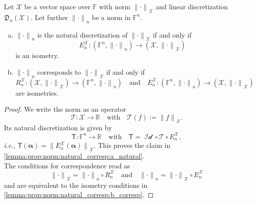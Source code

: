 \documentclass[a4paper]{paper}
\newcommand{\Discr}{\mathfrak{D}}
\newcommand{\Spc}[1]{\mathscr{#1}}
\newcommand{\Field}{\mathbb{F}}
\newcommand{\Real}{\mathbb{R}}
\newcommand{\Op}[1]{\mathcal{#1}}
\newcommand{\DiscOp}[1]{\mathsf{#1}}
\newcommand*{\EXT}[2]{\ensuremath{E_{#1}^{#2}}}
\newcommand*{\REST}[2]{\ensuremath{R_{#1}^{#2}}}
\newcommand*{\RnX}{\ensuremath{\REST{n}{\Spc{X}}}}
\newcommand*{\EnX}{\ensuremath{\EXT{n}{\Spc{X}}}}
\DeclareMathOperator{\Id}{Id}
\newcommand*{\NORM}[1]{\ensuremath{\lVert #1 \rVert}}
\newcommand{\ie}{\textsl{i.e.}\xspace}
\newcommand{\valpha}{\boldsymbol{\alpha}}
\begin{document}
\begin{lemma}
 \label{lemma:prop:norm:natural_corresp}
 Let $\Spc{X}$ be a vector space over $\Field$ with norm $\NORM{\cdot}_{\Spc{X}}$ and linear discretization 
 $\Discr_n(\Spc{X})$. Let further $\NORM{\cdot}_n$ be a norm in $\Field^n$.
 \begin{enumerate}[(a)]
  \item \label{lemma:prop:norm:natural_corresp:a_natural}
  $\NORM{\cdot}_n$ is the natural discretization of $\NORM{\cdot}_{\Spc{X}}$ if and only if
  \begin{equation*}
   \EnX \colon (\Field^n, \NORM{\cdot}_n) \to (\Spc{X}, \NORM{\cdot}_{\Spc{X}})
  \end{equation*}
  is an isometry.
  
  \item \label{lemma:prop:norm:natural_corresp:b_corresp}
  $\NORM{\cdot}_n$ corresponds to $\NORM{\cdot}_{\Spc{X}}$ if and only if
  \begin{equation*}
   \RnX \colon (\Spc{X}, \NORM{\cdot}_{\Spc{X}}) \to (\Field^n, \NORM{\cdot}_n)
   \quad \text{and} \quad
   \EnX \colon (\Field^n, \NORM{\cdot}_n) \to (\Spc{X}, \NORM{\cdot}_{\Spc{X}})
  \end{equation*}
  are isometries.
 \end{enumerate}
\end{lemma}
\vspace{1em}


\begin{proof}
 We write the norm as an operator
 \begin{equation*}
  \Op{T} \colon \Spc{X} \to \Real \quad \text{with} \quad \Op{T}(f) := \NORM{f}_{\Spc{X}}.
 \end{equation*}
 Its natural discretization is given by
 \begin{equation*}
  \DiscOp{T} \colon \Field^n \to \Real \quad \text{with} \quad \DiscOp{T} = \Op{\Id} \circ \Op{T} \circ \EnX,
 \end{equation*}
 \ie, $\DiscOp{T}(\valpha) = \NORM{\EnX(\valpha)}_{\Spc{X}}$. This proves the claim in 
 \eqref{lemma:prop:norm:natural_corresp:a_natural}.\\
 The conditions for correspondence read as
 \begin{equation*}
  \NORM{\cdot}_{\Spc{X}} = \NORM{\cdot}_n \circ \RnX
  \quad \text{and} \quad
  \NORM{\cdot}_n = \NORM{\cdot}_{\Spc{X}} \circ \EnX
 \end{equation*}
 and are equivalent to the isometry conditions in \eqref{lemma:prop:norm:natural_corresp:b_corresp}.
\end{proof}
\end{document}
